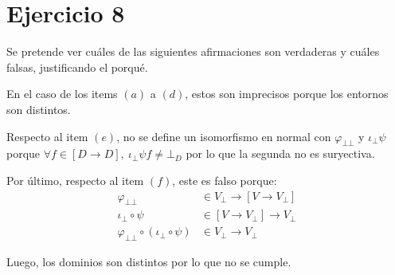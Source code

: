 \documentclass{article}
\newcommand{\bbot}{\bot\!\!\!\bot}
\newcommand{\ibot}{\iota_\bot}
\begin{document}
\section*{Ejercicio 8}
Se pretende ver cuáles de las siguientes afirmaciones son verdaderas y cuáles falsas, justificando el porqué.

En el caso de los items $(a)$ a $(d)$, estos son imprecisos porque los entornos son distintos.

Respecto al item $(e)$, no se define un isomorfismo en normal con $\varphi_{\bbot}$ y $\ibot\psi$ porque $\forall f \in [D \to D],\ \ibot\psi f \neq \bot_D$ por lo que la segunda no es suryectiva.

Por último, respecto al item $(f)$, este es falso porque:
\begin{equation*}
  \begin{aligned}
    \varphi_{\bbot} &\in V_\bot \to [V \to V_\bot] \\ 
    \ibot \circ \psi &\in [V \to V_\bot] \to V_\bot \\ 
    \varphi_{\bbot} \circ (\ibot \circ \psi) &\in V_\bot \to V_\bot 
  \end{aligned}
\end{equation*}

Luego, los dominios son distintos por lo que no se cumple.
\end{document}
